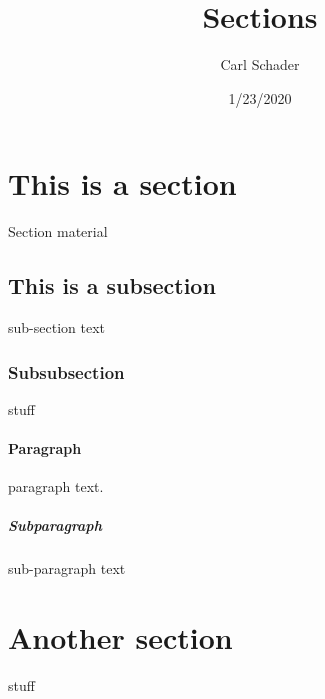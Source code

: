 \documentclass{article}
\title{Sections}
\date{1/23/2020}
\author{Carl Schader}
\begin{document}
	\maketitle
	\newpage


	\section{This is a section}
	Section material
	\subsection{This is a subsection}
	sub-section text
	\subsubsection{Subsubsection}
	stuff

	\paragraph{Paragraph}
	paragraph text.
	\subparagraph{Subparagraph}
	sub-paragraph text
	
	\section{Another section}
	stuff
\end{document}
